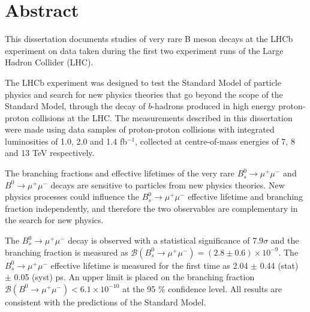 \chapter{Abstract}

This dissertation documents studies of very rare B meson decays at the LHCb experiment on data taken during the first two experiment runs of the Large Hadron Collider (LHC).



The LHCb experiment was designed to test the Standard Model of particle physics and search for new physics theories that go beyond the scope of the Standard Model, through the decay of $b$-hadrons produced in high energy proton-proton collisions at the LHC. The measurements described in this dissertation were made using data samples of proton-proton collisions with integrated luminosities of 1.0, 2.0 and 1.4 fb$^{-1}$, collected at centre-of-mass energies of 7, 8 and 13 TeV respectively. %


The branching fractions and effective lifetimes of the very rare $B_{s}^{0} \to \mu^{+} \mu^{-}$ and $B^{0} \to \mu^{+} \mu^{-}$  decays are sensitive to particles from new physics theories. %
New physics processes could influence the $B_{s}^{0} \to \mu^{+} \mu^{-}$  effective lifetime and branching fraction independently, and therefore the two observables are complementary in the search for new physics. 




The $B_{s}^{0} \to \mu^{+} \mu^{-}$ decay is observed with a statistical significance of 7.9$\sigma$ and the branching fraction is measured as  $\mathcal{B}(B_{s}^{0} \to \mu^{+} \mu^{-}) = (2.8 \pm 0.6) \times 10^{-9}$. The $B_{s}^{0} \to \mu^{+} \mu^{-}$ effective lifetime is measured for the first time as 2.04 $\pm$ 0.44 (stat) $\pm$ 0.05 (syst) ps.
An upper limit is placed on the branching fraction $\mathcal{B}(B^{0} \to \mu^{+} \mu^{-})< 6.1 \times 10^{-10}$ at the 95 $\%$ confidence level. All results are consistent with the predictions of the Standard Model. 

